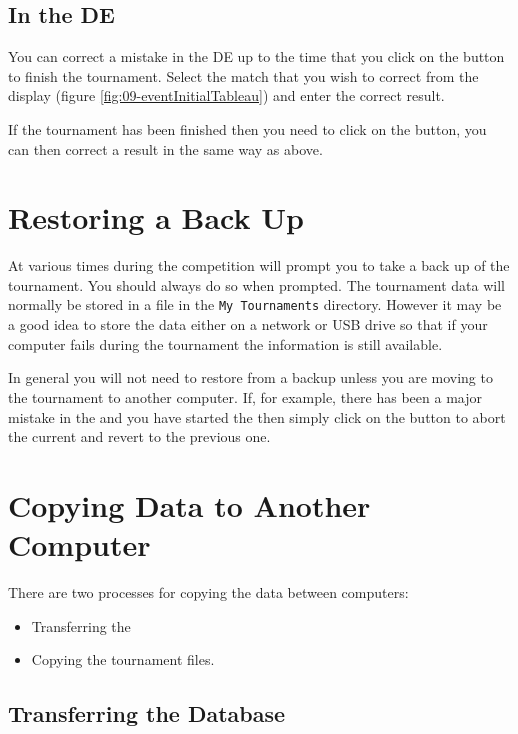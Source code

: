 \documentclass[a4paper,11pt]{memoir}
\begin{document}
\subsection{In the DE}

You can correct a mistake in the DE up to the time that you click on the  button to finish the tournament. Select the match that you wish to correct from the  display (figure \ref{fig:09-eventInitialTableau}) and enter the correct result.

If the tournament has been finished then you need to click on the  button, you can then correct a result in the same way as above.

\section{Restoring a Back Up}

At various times during the \gls{competition} \fencingtime{} will prompt you to take a back up of the tournament. You should always do so when prompted. The tournament data will normally be stored in a file in the \texttt{My Tournaments} directory. However it may be a good idea to store the data either on a network or USB drive so that if your computer fails during the tournament the information is still available.

In general you will not need to restore from a backup unless you are moving to the tournament to another computer. If, for example, there has been a major mistake in the  and you have started the  then simply click on the  button to abort the current  and revert to the previous one.

\section{Copying Data to Another Computer}

There are two processes for copying the data between computers:

\begin{itemize}
 \item Transferring the 
 \item Copying the tournament files.
\end{itemize}

\subsection{Transferring the Database}
\end{document}
